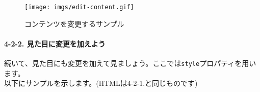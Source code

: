 \begin{itemize}
\begin{itemize}
\begin{Shaded}
\begin{Highlighting}[]
  \OperatorTok{=} \NormalTok{(}\NormalTok{)}\OperatorTok{;}
  \OperatorTok{=} \NormalTok{(}\NormalTok{)}\OperatorTok{;}

  \OperatorTok{=} \NormalTok{ () \{}
\OperatorTok{++;}
 \OperatorTok{+=} \VerbatimStringTok{\textasciigrave{}}\SpecialCharTok{$\{}\SpecialCharTok{\}}\VerbatimStringTok{\textasciigrave{}}\OperatorTok{;}
\NormalTok{  \}}\OperatorTok{;}

\NormalTok{(}\OperatorTok{,}\OperatorTok{;}
\end{Highlighting}
\end{Shaded}
  \end{itemize}
\end{itemize}

\begin{figure}
\centering
\texttt{[image: imgs/edit-content.gif]}
\caption{コンテンツを変更するサンプル}
\end{figure}

\paragraph{4-2-2.
見た目に変更を加えよう}\label{ux898bux305fux76eeux306bux5909ux66f4ux3092ux52a0ux3048ux3088ux3046}

続いて、見た目にも変更を加えて見ましょう。ここでは\texttt{style}プロパティを用います。\\
以下にサンプルを示します。(HTMLは4-2-1.と同じものです)

